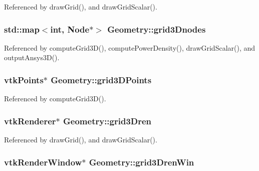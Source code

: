 Referenced by draw\-Grid(), and draw\-Grid\-Scalar().

\hypertarget{classGeometry_a64335b4700461be035cf7e89b7782cb6}{
\subsubsection[{grid3\-Dnodes}]{\setlength{\rightskip}{0pt plus 5cm}std\-::map$<$int, {\bf Node}$\ast$$>$ Geometry\-::grid3\-Dnodes\hspace{0.3cm}{\ttfamily [protected]}}}\label{classGeometry_a64335b4700461be035cf7e89b7782cb6}


Referenced by compute\-Grid3\-D(), compute\-Power\-Density(), draw\-Grid\-Scalar(), and output\-Ansys3\-D().

\hypertarget{classGeometry_afd79778e7c244df18be79a39419190c8}{
\subsubsection[{grid3\-D\-Points}]{\setlength{\rightskip}{0pt plus 5cm}vtk\-Points$\ast$ Geometry\-::grid3\-D\-Points\hspace{0.3cm}{\ttfamily [protected]}}}\label{classGeometry_afd79778e7c244df18be79a39419190c8}


Referenced by compute\-Grid3\-D().

\hypertarget{classGeometry_aafa37cf25f51c60ba5fa0e790994ce98}{
\subsubsection[{grid3\-Dren}]{\setlength{\rightskip}{0pt plus 5cm}vtk\-Renderer$\ast$ Geometry\-::grid3\-Dren\hspace{0.3cm}{\ttfamily [protected]}}}\label{classGeometry_aafa37cf25f51c60ba5fa0e790994ce98}


Referenced by draw\-Grid(), and draw\-Grid\-Scalar().

\hypertarget{classGeometry_af855a50f857e3aaa0ba5601daff0e73a}{
\subsubsection[{grid3\-Dren\-Win}]{\setlength{\rightskip}{0pt plus 5cm}vtk\-Render\-Window$\ast$ Geometry\-::grid3\-Dren\-Win\hspace{0.3cm}{\ttfamily [protected]}}}\label{classGeometry_af855a50f857e3aaa0ba5601daff0e73a}


